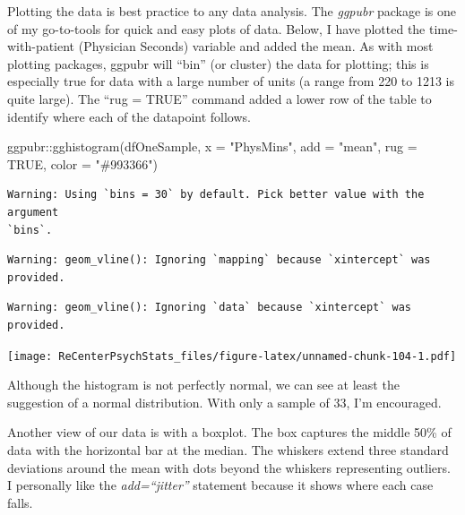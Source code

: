 \documentclass[
  11pt,
]{book}
\newenvironment{Shaded}{\begin{snugshade}}{\end{snugshade}}
\newcommand{\AttributeTok}[1]{\textcolor[rgb]{0.77,0.63,0.00}{#1}}
\newcommand{\ConstantTok}[1]{\textcolor[rgb]{0.00,0.00,0.00}{#1}}
\newcommand{\FunctionTok}[1]{\textcolor[rgb]{0.00,0.00,0.00}{#1}}
\newcommand{\NormalTok}[1]{#1}
\newcommand{\SpecialCharTok}[1]{\textcolor[rgb]{0.00,0.00,0.00}{#1}}
\newcommand{\StringTok}[1]{\textcolor[rgb]{0.31,0.60,0.02}{#1}}
\begin{document}
Plotting the data is best practice to any data analysis. The \emph{ggpubr} package is one of my go-to-tools for quick and easy plots of data. Below, I have plotted the time-with-patient (Physician Seconds) variable and added the mean. As with most plotting packages, ggpubr will ``bin'' (or cluster) the data for plotting; this is especially true for data with a large number of units (a range from 220 to 1213 is quite large). The ``rug = TRUE'' command added a lower row of the table to identify where each of the datapoint follows.

\begin{Shaded}
\begin{Highlighting}[]
\NormalTok{ggpubr}\SpecialCharTok{::}\FunctionTok{gghistogram}\NormalTok{(dfOneSample, }\AttributeTok{x =} \StringTok{"PhysMins"}\NormalTok{, }\AttributeTok{add =} \StringTok{"mean"}\NormalTok{, }\AttributeTok{rug =} \ConstantTok{TRUE}\NormalTok{,}
    \AttributeTok{color =} \StringTok{"\#993366"}\NormalTok{)}
\end{Highlighting}
\end{Shaded}

\begin{verbatim}
Warning: Using `bins = 30` by default. Pick better value with the argument
`bins`.
\end{verbatim}

\begin{verbatim}
Warning: geom_vline(): Ignoring `mapping` because `xintercept` was provided.
\end{verbatim}

\begin{verbatim}
Warning: geom_vline(): Ignoring `data` because `xintercept` was provided.
\end{verbatim}

\texttt{[image: ReCenterPsychStats\_files/figure-latex/unnamed-chunk-104-1.pdf]}

Although the histogram is not perfectly normal, we can see at least the suggestion of a normal distribution. With only a sample of 33, I'm encouraged.

Another view of our data is with a boxplot. The box captures the middle 50\% of data with the horizontal bar at the median. The whiskers extend three standard deviations around the mean with dots beyond the whiskers representing outliers. I personally like the \emph{add=``jitter''} statement because it shows where each case falls.

\begin{Shaded}
\end{Shaded}
\end{document}
